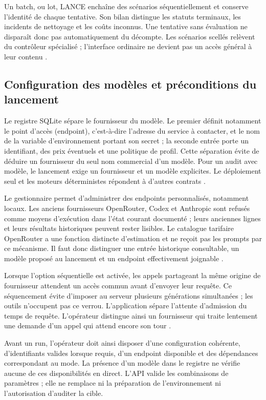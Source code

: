 \documentclass[11pt,a4paper]{article}
\begin{document}
Un batch, ou lot, LANCE enchaîne des scénarios
séquentiellement et conserve l'identité de chaque tentative. Son bilan distingue
les statuts terminaux, les incidents de nettoyage et les coûts inconnus. Une
tentative sans évaluation ne disparaît donc pas automatiquement du décompte.
Les scénarios scellés relèvent du contrôleur spécialisé ; l'interface ordinaire
ne devient pas un accès général à leur contenu \cite{app-start,app-batch-tests}.

\subsection{Configuration des modèles et préconditions du lancement}
Le registre SQLite sépare le fournisseur du modèle. Le premier définit notamment
le point d'accès (endpoint), c'est-à-dire l'adresse du service à contacter,
et le nom de la variable d'environnement portant son secret ;
la seconde entrée porte un identifiant, des prix éventuels et une politique de
profil. Cette séparation évite de déduire un fournisseur du seul nom commercial
d'un modèle. Pour un audit avec modèle, le lancement exige un fournisseur et un
modèle explicites. Le déploiement seul et les moteurs déterministes répondent
à d'autres contrats \cite{arch-db,app-providers,app-start}.

Le gestionnaire permet d'administrer des endpoints personnalisés, notamment
locaux. Les anciens fournisseurs OpenRouter, Codex et Anthropic sont refusés
comme moyens d'exécution dans l'état courant documenté ; leurs anciennes lignes
et leurs résultats historiques peuvent rester lisibles. Le catalogue tarifaire
OpenRouter a une fonction distincte d'estimation et ne reçoit pas les prompts
par ce mécanisme. Il faut donc distinguer une entrée historique consultable,
un modèle proposé au lancement et un endpoint effectivement joignable
\cite{app-auth-guide}.

Lorsque l'option séquentielle est activée, les appels partageant la même
origine de fournisseur attendent un accès commun avant d'envoyer leur requête.
Ce séquencement évite d'imposer au serveur plusieurs générations simultanées ;
les outils n'occupent pas ce verrou. L'application sépare l'attente d'admission
du temps de requête. L'opérateur distingue ainsi un fournisseur qui traite
lentement une demande d'un appel qui attend encore son tour
\cite{arch-admission,app-artifacts}.

Avant un run, l'opérateur doit ainsi disposer d'une configuration cohérente,
d'identifiants valides lorsque requis, d'un endpoint disponible et des
dépendances correspondant au mode. La présence d'un modèle dans le registre
ne vérifie aucune de ces disponibilités en direct. L'API valide les combinaisons
de paramètres ; elle ne remplace ni la préparation de l'environnement ni
l'autorisation d'auditer la cible.
\end{document}
